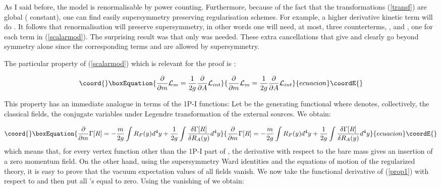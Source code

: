 \documentclass[a4paper,11pt]{article}
\begin{document}
As I said before, the model is renormalisable by power counting. Furthermore, because 
of the fact that the transformations (\ref{transf}) are global (\myHighlight{$\alpha$}\coordHE{} constant), 
one can find easily supersymmetry preserving regularisation schemes. 
For example, a higher derivative kinetic term will do \cite {IZ}. It follows that 
renormalisation will preserve supersymmetry, in other words one will need, at most, 
three counterterms, \coordHE{}, \coordHE{} and \coordHE{}, one for each term in (\ref{scalarmod}). The surprising result was that only \coordHE{} was needed. These extra cancellations that give  \coordHE{} and \coordHE{} clearly go beyond symmetry alone since the corresponding terms \coordHE{} and  \coordHE{} are allowed by supersymmetry.

The particular property of (\ref{scalarmod}) which is relevant for the proof is 
\cite {IZ}:

\begin{equation}\coord{}\boxEquation{
\label{prop}
\frac{\partial}{{\partial}m}{\cal{L}}_m = \frac{1}{2g}\frac{\partial}{\partial A}
{\cal{L}}_{int}
}{
\frac{\partial}{{\partial}m}{\cal{L}}_m = \frac{1}{2g}\frac{\partial}{\partial A}
{\cal{L}}_{int}
}{ecuacion}\coordE{}\end{equation}

This property has an immediate analogue in terms of the 1P-I functions: Let 
\myHighlight{$\Gamma [R]$}\coordHE{} be the generating functional where  \coordHE{} denotes, collectively, the 
classical fields, the conjugate variables under Legendre transformation of the 
external sources. We obtain:

\begin{equation}\coord{}\boxEquation{
\label{prop1}
\frac{\partial}{{\partial}m} \Gamma [R] = -\frac{m}{2g} \int R_F(y)d^4 y + 
\frac{1}{2g} \int \frac{\delta \Gamma [R]}{\delta R_A (y)} d^4 y
}{
\frac{\partial}{{\partial}m} \Gamma [R] = -\frac{m}{2g} \int R_F(y)d^4 y + 
\frac{1}{2g} \int \frac{\delta \Gamma [R]}{\delta R_A (y)} d^4 y
}{ecuacion}\coordE{}\end{equation}
\noindent
which means that, for 
every vertex function other than the 
1P-I part of \coordHE{}, the derivative with respect to the bare mass 
gives an insertion of a zero momentum \coordHE{} field. On the other hand, using the 
supersymmetry Ward identities and the equations of motion of the regularized theory, 
it is easy to prove \cite {IZ} that the vacuum expectation values of all fields 
vanish. We now take the functional derivative of (\ref{prop1}) with respect to 
\coordHE{} and then put all \coordHE{}'s equal to zero. Using the vanishing of \coordHE{} we 
obtain:
\end{document}
